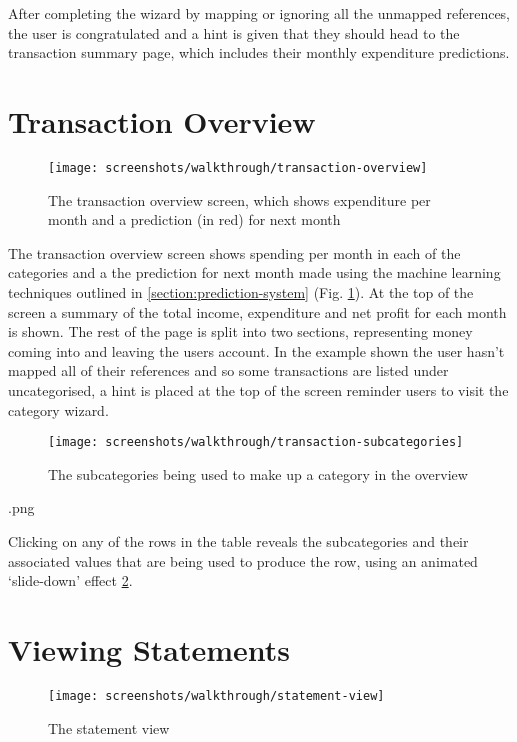 After completing the wizard by mapping or ignoring all the unmapped references, the user is congratulated and a hint is given that they should head to the transaction summary page, which includes their monthly expenditure predictions.

\section{Transaction Overview}

\begin{figure}
\centering
\texttt{[image: screenshots/walkthrough/transaction-overview]}
\caption[The transaction overview screen]{The transaction overview screen, which shows expenditure per month and a prediction (in red) for next month}
\label{fig:transaction-overview}
\end{figure}

The transaction overview screen shows spending per month in each of the categories and a the prediction for next month made using the machine learning techniques outlined in \autoref{section:prediction-system} (Fig. \ref{fig:transaction-overview}). At the top of the screen a summary of the total income, expenditure and net profit for each month is shown. The rest of the page is split into two sections, representing money coming into and leaving the users account. In the example shown the user hasn't mapped all of their references and so some transactions are listed under uncategorised, a hint is placed at the top of the screen reminder users to visit the category wizard. 

\begin{figure}
\centering
\texttt{[image: screenshots/walkthrough/transaction-subcategories]}
\caption{The subcategories being used to make up a category in the overview}
\label{fig:transaction-subcategories}
\end{figure}
.png

Clicking on any of the rows in the table reveals the subcategories and their associated values that are being used to produce the row, using an animated `slide-down' effect \ref{fig:transaction-subcategories}. 

\section{Viewing Statements}
\begin{figure}
\centering
\texttt{[image: screenshots/walkthrough/statement-view]}
\caption{The statement view}
\label{fig:statement-view}
\end{figure}

